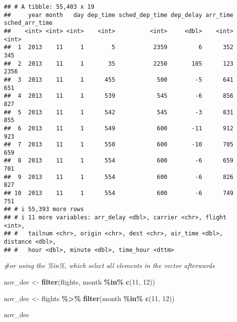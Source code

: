 \documentclass[
]{article}
\newenvironment{Shaded}{\begin{snugshade}}{\end{snugshade}}
\newcommand{\CommentTok}[1]{\textcolor[rgb]{0.56,0.35,0.01}{\textit{#1}}}
\newcommand{\DecValTok}[1]{\textcolor[rgb]{0.00,0.00,0.81}{#1}}
\newcommand{\FunctionTok}[1]{\textcolor[rgb]{0.13,0.29,0.53}{\textbf{#1}}}
\newcommand{\NormalTok}[1]{#1}
\newcommand{\OtherTok}[1]{\textcolor[rgb]{0.56,0.35,0.01}{#1}}
\newcommand{\SpecialCharTok}[1]{\textcolor[rgb]{0.81,0.36,0.00}{\textbf{#1}}}
\begin{document}
\begin{verbatim}
## # A tibble: 55,403 x 19
##     year month   day dep_time sched_dep_time dep_delay arr_time sched_arr_time
##    <int> <int> <int>    <int>          <int>     <dbl>    <int>          <int>
##  1  2013    11     1        5           2359         6      352            345
##  2  2013    11     1       35           2250       105      123           2356
##  3  2013    11     1      455            500        -5      641            651
##  4  2013    11     1      539            545        -6      856            827
##  5  2013    11     1      542            545        -3      831            855
##  6  2013    11     1      549            600       -11      912            923
##  7  2013    11     1      550            600       -10      705            659
##  8  2013    11     1      554            600        -6      659            701
##  9  2013    11     1      554            600        -6      826            827
## 10  2013    11     1      554            600        -6      749            751
## # i 55,393 more rows
## # i 11 more variables: arr_delay <dbl>, carrier <chr>, flight <int>,
## #   tailnum <chr>, origin <chr>, dest <chr>, air_time <dbl>, distance <dbl>,
## #   hour <dbl>, minute <dbl>, time_hour <dttm>
\end{verbatim}

\begin{Shaded}
\begin{Highlighting}[]
\CommentTok{\#or using the \%in\%, which select all elements in the vector afterwards }

\NormalTok{nov\_dec }\OtherTok{\textless{}{-}} \FunctionTok{filter}\NormalTok{(flights, month }\SpecialCharTok{\%in\%} \FunctionTok{c}\NormalTok{(}\DecValTok{11}\NormalTok{, }\DecValTok{12}\NormalTok{))}

\NormalTok{nov\_dec }\OtherTok{\textless{}{-}}\NormalTok{ flights }\SpecialCharTok{\%\textgreater{}\%} \FunctionTok{filter}\NormalTok{(month }\SpecialCharTok{\%in\%} \FunctionTok{c}\NormalTok{(}\DecValTok{11}\NormalTok{, }\DecValTok{12}\NormalTok{))}

\NormalTok{nov\_dec}
\end{Highlighting}
\end{Shaded}
\end{document}

